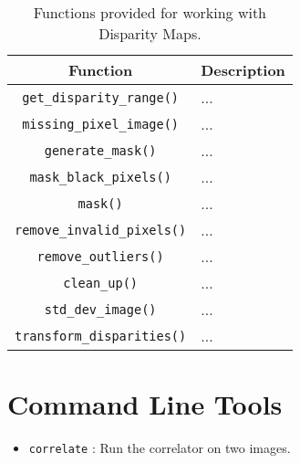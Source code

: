 \begin{table}[htb]\begin{centering}
\begin{tabular}{|c|l|} \hline
Function & Description \\ \hline \hline
\verb#get_disparity_range()# & ... \\ \hline
\verb#missing_pixel_image()# & ... \\ \hline
\verb#generate_mask()# & ... \\ \hline
\verb#mask_black_pixels()# & ... \\ \hline
\verb#mask()# & ... \\ \hline
\verb#remove_invalid_pixels()# & ... \\ \hline
\verb#remove_outliers()# & ... \\ \hline
\verb#clean_up()# & ... \\ \hline
\verb#std_dev_image()# & ... \\ \hline
\verb#transform_disparities()# & ... \\ \hline
\end{tabular}
\caption{ Functions provided for working with Disparity Maps.}
\label{tbl:disparity-map-functions}
\end{centering}
\end{table}

\section{Command Line Tools}

\begin{itemize}
\item \verb#correlate#   : Run the correlator on two images.
\end{itemize}



\begin{thebibliography}{1}

\end{thebibliography}

